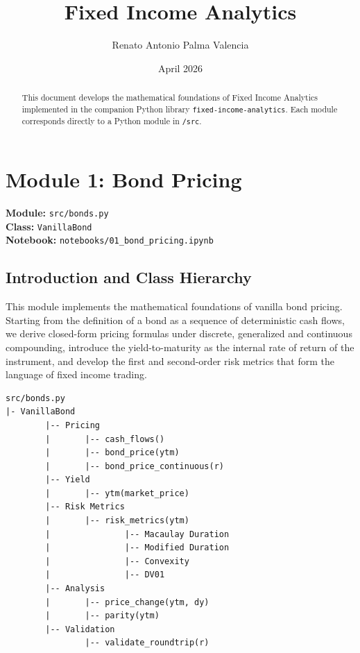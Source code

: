 \documentclass{article}
\title{Fixed Income Analytics}
\author{Renato Antonio Palma Valencia}
\date{April 2026}
\theoremstyle{definition}  %
\theoremstyle{plain}  %
\numberwithin{definition}{section}
\numberwithin{proposition}{section}
\numberwithin{theorem}{section}
\numberwithin{equation}{section}
\begin{document}
\pagecolor{white}

\maketitle

\newpage

\tableofcontents

\newpage

\begin{abstract}
    This document develops the mathematical foundations of Fixed Income Analytics implemented in the companion Python library \texttt{fixed-income-analytics}. Each module corresponds directly to a Python module in \texttt{/src}.
\end{abstract}

\section{Module 1: Bond Pricing}
\label{sec:M1}

\begin{tcolorbox}[title = Python Implementation, colback = pythonyellow!70!white, colframe = pythonblue]
    \textbf{Module:} \color{magenta} \texttt{src/bonds.py}  \color{black}\\
    \textbf{Class:} \color{codegreen} \texttt{VanillaBond} \color{black} \\
    \textbf{Notebook:} \texttt{notebooks/01\_bond\_pricing.ipynb}
\end{tcolorbox}

\subsection{Introduction and Class Hierarchy}

This module implements the mathematical foundations of vanilla bond pricing. Starting from the definition of a bond as a sequence of deterministic cash flows, we derive closed-form pricing formulas under discrete, generalized and continuous compounding, introduce the yield-to-maturity as the internal rate of return of the instrument, and develop the first and second-order risk metrics that form the language of fixed income trading.

\begin{verbatim}
src/bonds.py
|- VanillaBond
        |-- Pricing
        |       |-- cash_flows()
        |       |-- bond_price(ytm)
        |       |-- bond_price_continuous(r)
        |-- Yield
        |       |-- ytm(market_price)
        |-- Risk Metrics
        |       |-- risk_metrics(ytm)
        |               |-- Macaulay Duration
        |               |-- Modified Duration
        |               |-- Convexity
        |               |-- DV01
        |-- Analysis
        |       |-- price_change(ytm, dy)
        |       |-- parity(ytm)
        |-- Validation
                |-- validate_roundtrip(r)
\end{verbatim}
\end{document}
